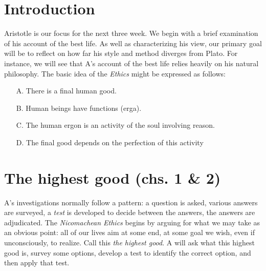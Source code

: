 \documentclass[oneside]{article}
\begin{document}
\thispagestyle{fancy}

\section*{Introduction}
Aristotle is our focus for the next three week. We begin with a brief examination of his account of the best life. As well as characterizing his view, our primary goal will be to reflect on how far his style and method diverges from Plato. For instance, we will see that A's account of the best life relies heavily on his natural philosophy. The basic idea of the \emph{Ethics} might be expressed as follows: 

\begin{enumerate}
\item[A.] There is a final human good. 
\item[B.] Human beings have functions (erga).
\item[C.] The human ergon is an activity of the soul involving reason.
\item[D.] The final good depends on the perfection of this activity
\end{enumerate}

\section*{The highest good (chs. 1 \& 2)}

A's investigations normally follow a pattern: a question is asked, various answers are surveyed, a \emph{test} is developed to decide between the answers, the answers are adjudicated. The \emph{Nicomachean Ethics} begins by arguing for what we may take as an obvious point: all of our lives aim at some end, at some goal we wish, even if unconsciously, to realize. Call this \emph{the highest good}. A will ask what this highest good is, survey some options, develop a test to identify the correct option, and then apply that test.
\end{document}
